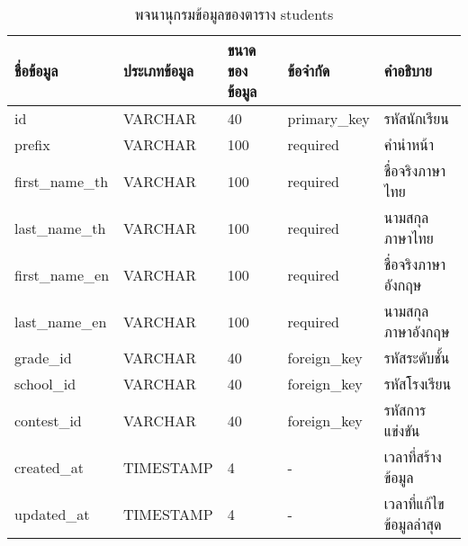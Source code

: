 \begin{table}[htbp]
    \caption{พจนานุกรมข้อมูลของตาราง students}
    \label{tab:database-students}
    \begin{tabularx}{\textwidth}{ | p{2.25cm} | p{2.20cm} | p{2.45cm} | p{2cm} | X | }
    \hline
    \textbf{ชื่อข้อมูล} & \textbf{ประเภทข้อมูล} & \textbf{ขนาดของข้อมูล} & \textbf{ข้อจำกัด} & \textbf{คำอธิบาย} \\
    \hline
    id & VARCHAR & 40 & primary\_key & รหัสนักเรียน \\
    \hline
    prefix & VARCHAR & 100 & required & คำนำหน้า \\
    \hline
    first\_name\_th & VARCHAR & 100 & required & ชื่อจริงภาษาไทย \\
    \hline
    last\_name\_th & VARCHAR & 100 & required & นามสกุลภาษาไทย \\
    \hline
    first\_name\_en & VARCHAR & 100 & required & ชื่อจริงภาษาอังกฤษ \\
    \hline
    last\_name\_en & VARCHAR & 100 & required & นามสกุลภาษาอังกฤษ \\
    \hline
    grade\_id & VARCHAR & 40 & foreign\_key & รหัสระดับชั้น \\
    \hline
    school\_id & VARCHAR & 40 & foreign\_key & รหัสโรงเรียน \\
    \hline
    contest\_id & VARCHAR & 40 & foreign\_key & รหัสการแข่งขัน \\
    \hline
    created\_at & TIMESTAMP & 4 & - & เวลาที่สร้างข้อมูล \\
    \hline
    updated\_at & TIMESTAMP & 4 & - & เวลาที่แก้ไขข้อมูลล่าสุด \\
    \hline
    \end{tabularx}
\end{table}
